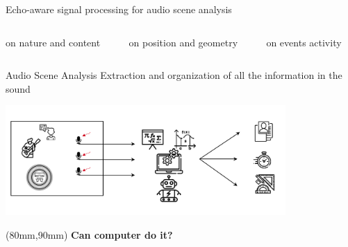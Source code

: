 \begin{frame}[t]{Echo-aware signal processing for \alert{audio scene analysis}}
    \begin{columns}
        \begin{column}[t]{0.3\textwidth}
            \centering
            on nature and content
        \end{column}
        \begin{column}[t]{0.3\textwidth}
            \centering
            on position and geometry
        \end{column}
        \begin{column}[t]{0.3\textwidth}
            \centering
            on events activity
        \end{column}
    \end{columns}


    \vfill
    \begin{mydefblock}{Audio Scene Analysis}
        Extraction and organization of all the information in the sound
    \end{mydefblock}

    \begin{center}
        \includegraphics[trim={0 35mm 0 35mm},clip,width=0.8\textwidth]{figures/scene_analysis.png}
    \end{center}

    \begin{textblock*}{40mm}(80mm,90mm)
        \textcolor{myred}{\textbf{Can computer do it?}}
    \end{textblock*}

\end{frame}

